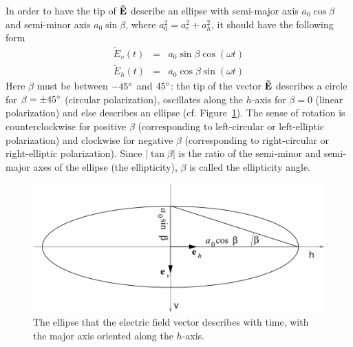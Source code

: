In order to have the tip of $\mathbf{\tilde{E}}$ describe an ellipse with semi-major axis $a_0 \cos\beta$
and
semi-minor axis $a_0 \sin\beta$, where $a_0^2 = a_v^2 + a_h^2$, 
it should have the following form
\begin{eqnarray}
  \label{eq:polarization:ellipse_parallel}
 \tilde{E}_v (t) &=&   a_0 \sin\beta \cos(\omega t)\\
 \tilde{E}_h (t) &=&   a_0 \cos\beta \sin(\omega t)
\end{eqnarray}
Here $\beta$ must be between $-45^\circ$ and $45^\circ$: the tip of
the vector $\mathbf{\tilde{E}}$ describes a circle for $\beta = \pm
45^\circ$ (circular polarization), oscillates along the $h$-axis for
$\beta = 0$ (linear polarization) and else describes an ellipse (cf.
Figure~\ref{fig:polarization:ellipse_aligned}). The sense of rotation
is counterclockwise for positive $\beta$ (corresponding to left-circular
or left-elliptic polarization) and clockwise for negative
$\beta$ (corresponding to right-circular
or right-elliptic polarization).
Since $|\tan\beta|$ is the ratio of the semi-minor and semi-major axes
of the ellipse (the ellipticity), $\beta$ is called the ellipticity
angle.
\begin{figure}[!h]
 \begin{center}
  \begin{minipage}[c]{0.9\textwidth}
   \begin{center}
    \includegraphics*[width=0.9\hsize]{Figs/polarization/pol_ellipse_aligned}
   \end{center}
  \end{minipage}
  \begin{minipage}[c]{0.9\textwidth}
   \caption{The ellipse that the electric field vector describes with
     time, with the major axis oriented along the $h$-axis.}
   \label{fig:polarization:ellipse_aligned}
  \end{minipage}
 \end{center}
\end{figure}   
